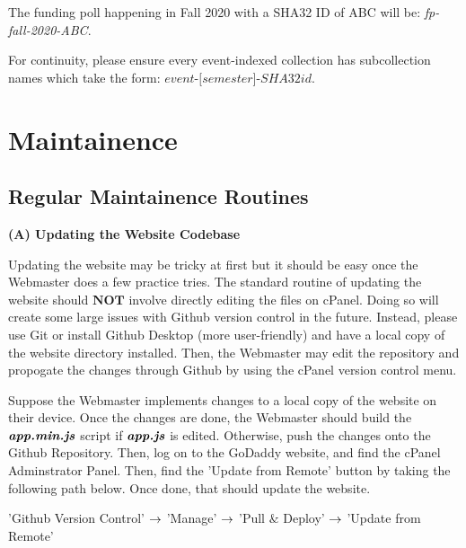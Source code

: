 \documentclass[a4paper]{article}
\begin{document}
\begin{example*}
The funding poll happening in Fall 2020 with a SHA32 ID of ABC will be: \textit{fp-fall-2020-ABC}.
\end{example*}
For continuity, please ensure every event-indexed collection has subcollection names which take the form: $\textit{event-[semester]-SHA32id}$.


\newpage
\section{Maintainence}
\subsection{Regular Maintainence Routines}


\begin{center}
\textbf{(A) Updating the Website Codebase}
\end{center}

Updating the website may be tricky at first but it should be easy once the Webmaster does a few practice tries. The standard routine of updating the website should $\textbf{NOT}$ involve directly editing the files on cPanel. Doing so will create some large issues with Github version control in the future. Instead, please use Git or install Github Desktop (more user-friendly) and have a local copy of the website directory installed. Then, the Webmaster may edit the repository and propogate the changes through Github by using the cPanel version control menu.

Suppose the Webmaster implements changes to a local copy of the website on their device. Once the changes are done, the Webmaster should build the $\textbf{\textit{app.min.js}}$ script if $\textbf{\textit{app.js}}$ is edited. Otherwise, push the changes onto the Github Repository. Then, log on to the GoDaddy website, and find the cPanel Adminstrator Panel. Then, find the 'Update from Remote' button by taking the following path below. Once done, that should update the website.
\begin{center}
'Github Version Control' $\rightarrow$ 'Manage' $\rightarrow$ 'Pull $\&$ Deploy' $\rightarrow$ 'Update from Remote'
\end{center}
\end{document}
